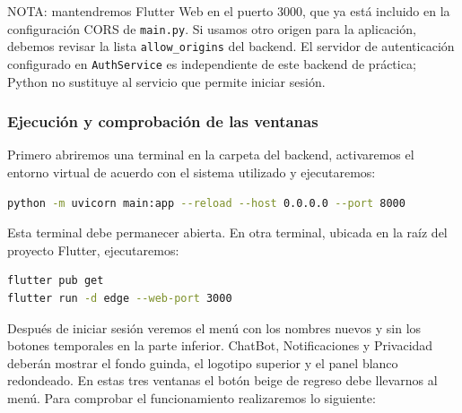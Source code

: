 NOTA: mantendremos Flutter Web en el puerto 3000, que ya está incluido en la configuración CORS de \texttt{main.py}. Si usamos otro origen para la aplicación, debemos revisar la lista \texttt{allow\_origins} del backend. El servidor de autenticación configurado en \texttt{AuthService} es independiente de este backend de práctica; Python no sustituye al servicio que permite iniciar sesión.

\subsubsection{Ejecución y comprobación de las ventanas}
Primero abriremos una terminal en la carpeta del backend, activaremos el entorno virtual de acuerdo con el sistema utilizado y ejecutaremos:

\begin{lstlisting}[language=bash, caption={Inicio del backend para la práctica integrada}]
python -m uvicorn main:app --reload --host 0.0.0.0 --port 8000
\end{lstlisting}

Esta terminal debe permanecer abierta. En otra terminal, ubicada en la raíz del proyecto Flutter, ejecutaremos:

\begin{lstlisting}[language=bash, caption={Inicio de Flutter Web}]
flutter pub get
flutter run -d edge --web-port 3000
\end{lstlisting}

Después de iniciar sesión veremos el menú con los nombres nuevos y sin los botones temporales en la parte inferior. ChatBot, Notificaciones y Privacidad deberán mostrar el fondo guinda, el logotipo superior y el panel blanco redondeado. En estas tres ventanas el botón beige de regreso debe llevarnos al menú. Para comprobar el funcionamiento realizaremos lo siguiente:

